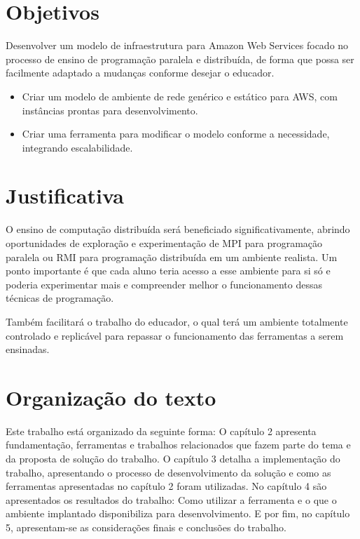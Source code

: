 \documentclass[tg]{mdtufsm}
\begin{document}
\section{Objetivos}

Desenvolver um modelo de infraestrutura para Amazon Web Services focado no processo de ensino de programação paralela e distribuída, de forma que possa ser facilmente adaptado a mudanças conforme desejar o educador.

\begin{itemize}
\item Criar um modelo de ambiente de rede genérico e estático para AWS, com instâncias prontas para desenvolvimento.
\item Criar uma ferramenta para modificar o modelo conforme a necessidade, integrando escalabilidade.
\end{itemize}

\section{Justificativa}

O ensino de computação distribuída será beneficiado significativamente, abrindo oportunidades de exploração e experimentação de MPI para programação paralela ou RMI para programação distribuída em um ambiente realista. Um ponto importante é que cada aluno teria acesso a esse ambiente para si só e poderia experimentar mais e compreender melhor o funcionamento dessas técnicas de programação.

Também facilitará o trabalho do educador, o qual terá um ambiente totalmente controlado e replicável para repassar o funcionamento das ferramentas a serem ensinadas.

\section{Organização do texto}

Este trabalho está organizado da seguinte forma: O capítulo 2 apresenta fundamentação, ferramentas e trabalhos relacionados que fazem parte do tema e da proposta de solução do trabalho.
O capítulo 3 detalha a implementação do trabalho, apresentando o processo de desenvolvimento da solução e como as ferramentas apresentadas no capítulo 2 foram utilizadas.
No capítulo 4 são apresentados os resultados do trabalho: Como utilizar a ferramenta e o que o ambiente implantado disponibiliza para desenvolvimento. E por fim, no capítulo 5, apresentam-se as considerações finais e conclusões do trabalho.
\end{document}
